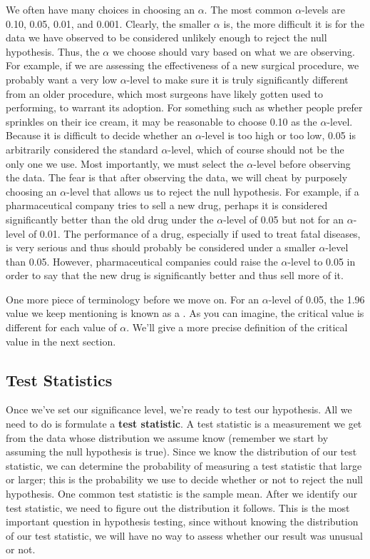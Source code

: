 We often have many choices in choosing an $\alpha$. The most common $\alpha$-levels are 0.10, 0.05, 0.01, and 0.001. Clearly, the smaller $\alpha$ is, the more difficult it is for the data we have observed to be considered unlikely enough to reject the null hypothesis. Thus, the $\alpha$ we choose should vary based on what we are observing. For example, if we are assessing the effectiveness of a new surgical procedure, we probably want a very low $\alpha$-level to make sure it is truly significantly different from an older procedure, which most surgeons have likely gotten used to performing, to warrant its adoption. For something such as whether people prefer sprinkles on their ice cream, it may be reasonable to choose 0.10 as the $\alpha$-level. Because it is difficult to decide whether an $\alpha$-level is too high or too low, 0.05 is arbitrarily considered the standard $\alpha$-level, which of course should not be the only one we use. Most importantly, we must select the $\alpha$-level before observing the data. The fear is that after observing the data, we will cheat by purposely choosing an $\alpha$-level that allows us to reject the null hypothesis. For example, if a pharmaceutical company tries to sell a new drug, perhaps it is considered significantly better than the old drug under the $\alpha$-level of 0.05 but not for an $\alpha$-level of 0.01. The performance of a drug, especially if used to treat fatal diseases, is very serious and thus should probably be considered under a smaller $\alpha$-level than 0.05. However, pharmaceutical companies could raise the $\alpha$-level to 0.05 in order to say that the new drug is significantly better and thus sell more of it. 

One more piece of terminology before we move on.  For an $\alpha$-level of 0.05, the 1.96 value we keep mentioning is known as a . As you can imagine, the critical value is different for each value of $\alpha$.  We'll give a more precise definition of the critical value in the next section.


\subsection{Test Statistics}
Once we've set our significance level, we're ready to test our hypothesis. All we need to do is formulate a \textbf{test statistic}. A test statistic is a measurement we get from the data whose distribution we assume know (remember we start by assuming the null hypothesis is true). Since we know the distribution of our test statistic, we can determine the probability of measuring a test statistic that large or larger; this is the probability we use to decide whether or not to reject the null hypothesis.  One common test statistic is the sample mean. After we identify our test statistic, we need to figure out the distribution it follows.  This is the most important question in hypothesis testing, since without knowing the distribution of our test statistic, we will have no way to assess whether our result was unusual or not.

